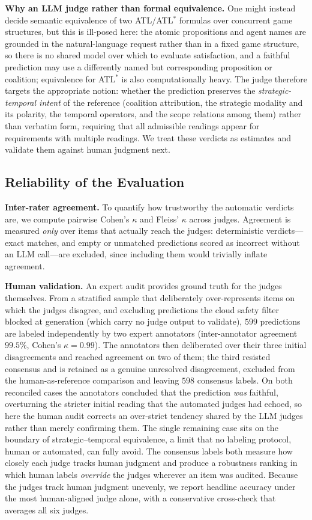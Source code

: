 \noindent\textbf{Why an LLM judge rather than formal equivalence.} One might instead decide semantic equivalence of two ATL/ATL$^\ast$ formulas over concurrent game structures, but this is ill-posed here: the atomic propositions and agent names are grounded in the natural-language request rather than in a fixed game structure, so there is no shared model over which to evaluate satisfaction, and a faithful prediction may use a differently named but corresponding proposition or coalition; equivalence for ATL$^\ast$ is also computationally heavy. The judge therefore targets the appropriate notion: whether the prediction preserves the \emph{strategic-temporal intent} of the reference (coalition attribution, the strategic modality and its polarity, the temporal operators, and the scope relations among them) rather than verbatim form, requiring that all admissible readings appear for requirements with multiple readings. We treat these verdicts as estimates and validate them against human judgment next.

\subsection{Reliability of the Evaluation}
\noindent\textbf{Inter-rater agreement.} To quantify how trustworthy the automatic verdicts are, we compute pairwise Cohen's $\kappa$ and Fleiss' $\kappa$ across judges. Agreement is measured \emph{only} over items that actually reach the judges: deterministic verdicts---exact matches, and empty or unmatched predictions scored as incorrect without an LLM call---are excluded, since including them would trivially inflate agreement.

\noindent\textbf{Human validation.} An expert audit provides ground truth for the judges themselves. From a stratified sample that deliberately over-represents items on which the judges disagree, and excluding predictions the cloud safety filter blocked at generation (which carry no judge output to validate), $599$ predictions are labeled independently by two expert annotators (inter-annotator agreement $99.5\%$, Cohen's $\kappa=0.99$). The annotators then deliberated over their three initial disagreements and reached agreement on two of them; the third resisted consensus and is retained as a genuine unresolved disagreement, excluded from the human-as-reference comparison and leaving $598$ consensus labels. On both reconciled cases the annotators concluded that the prediction \emph{was} faithful, overturning the stricter initial reading that the automated judges had echoed, so here the human audit corrects an over-strict tendency shared by the LLM judges rather than merely confirming them. The single remaining case sits on the boundary of strategic--temporal equivalence, a limit that no labeling protocol, human or automated, can fully avoid. The consensus labels both measure how closely each judge tracks human judgment and produce a robustness ranking in which human labels \emph{override} the judges wherever an item was audited. Because the judges track human judgment unevenly, we report headline accuracy under the most human-aligned judge alone, with a conservative cross-check that averages all six judges.

